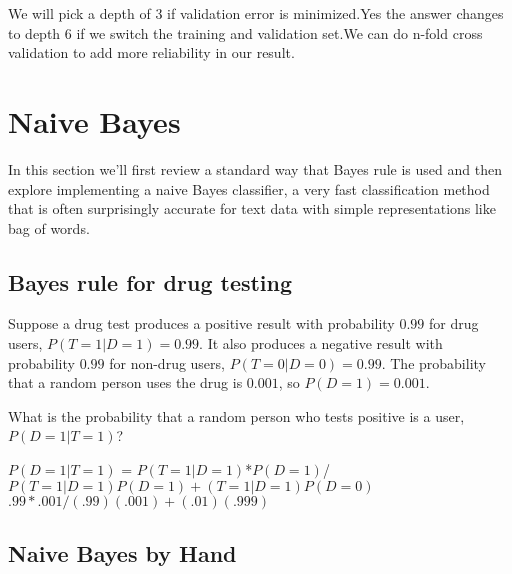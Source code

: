 \documentclass{article}
\def\blu#1{{\color{blu}#1}}
\def\gre#1{{\color{gre}#1}}
\begin{document}
\gre{We will pick a depth of 3 if validation error is minimized.Yes the answer changes to depth 6 if we switch the training and validation set.We can do n-fold cross validation to add more reliability in our result. }




\section{Naive Bayes}

In this section we'll first review a standard way that Bayes rule is used and then explore implementing a naive Bayes classifier, a very fast classification method that is often surprisingly accurate for text data with simple representations like bag of words.


\subsection{Bayes rule for drug testing}

Suppose a drug test produces a positive result with probability $0.99$ for drug users, $P(T=1|D=1)=0.99$. It also produces a negative result with probability $0.99$ for non-drug users, $P(T=0|D=0)=0.99$. The probability that a random person uses the drug is $0.001$, so $P(D=1)=0.001$.

\blu{What is the probability that a random person who tests positive is a user, $P(D=1|T=1)$?}

\gre{$P(D=1|T=1)$ = $P(T=1|D=1)$*$P(D=1)$/$P(T=1|D=1)P(D=1) +(T=1|D=1)P(D=0)$}
\gre{$.99*.001/(.99)(.001)+(.01)(.999)$}



\subsection{Naive Bayes by Hand}
\end{document}
